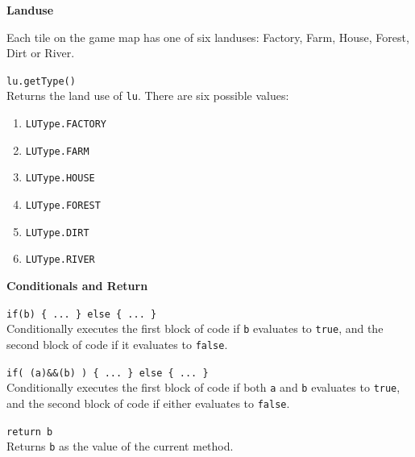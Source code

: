 \documentclass[10pt,twocolumn]{article}
\begin{document}
\noindent\textbf{\large Landuse}
\begin{description}

\item{}
Each tile on the game map has one of six landuses: Factory, Farm, House, Forest, Dirt or River.

\item{\texttt{lu.getType()}}\ \\[.25em]
%
  Returns the land use of \texttt{lu}. There are six possible values:
  \begin{enumerate}
  \item\texttt{LUType.FACTORY}
  \item\texttt{LUType.FARM}
  \item\texttt{LUType.HOUSE}
  \item\texttt{LUType.FOREST}
  \item\texttt{LUType.DIRT}
  \item\texttt{LUType.RIVER}
  \end{enumerate}

\end{description}


\medskip

\noindent\textbf{\large Conditionals and Return}
\begin{description}

\item{\texttt{if(b) \{ ... \} else \{ ... \}}}\ \\[.25em] 
% 
Conditionally executes the first block of code if \texttt{b} evaluates to
\texttt{true}, and the second block of code if it evaluates to \texttt{false}.

\item{\texttt{if( (a)\&\&(b) ) \{ ... \} else \{ ... \}}}\ \\[.25em] 
% 
Conditionally executes the first block of code if both \texttt{a} and \texttt{b} evaluates to
\texttt{true}, and the second block of code if either evaluates to \texttt{false}.

\item{\texttt{return b}} \ \\[.25em]
%
  Returns \texttt{b} as the value of the current method.
\end{description}

\medskip

\balance
\end{document}
